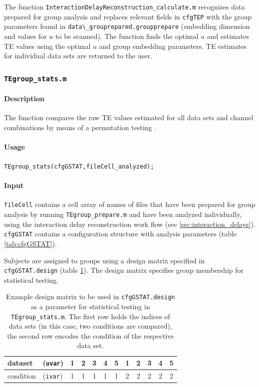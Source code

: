 \documentclass[a4paper,10pt]{article}
\begin{document}
The function \verb&InteractionDelayReconstruction_calculate.m& recognizes data prepared for group analysis and replaces relevant fields in \verb&cfgTEP& with the group parameters found in \verb&data\_grouprepared.groupprepare& (embedding dimension and values for $u$ to be scanned). The function finds the optimal $u$ and estimates TE values using the optimal $u$ and group embedding parameters. TE estimates for individual data sets are returned to the user. 

\subsubsection{\texttt{TEgroup\_stats.m}}

\paragraph*{Description} The function compares the raw TE values estimated for all data sets and channel combinations by means of a permutation testing \cite{maris2007,lindner2011}. 

\paragraph*{Usage} \verb&TEgroup_stats(cfgGSTAT,fileCell_analyzed);& 

\paragraph*{Input} \verb&fileCell& contains a cell array of names of files that have been prepared for group analysis by running \texttt{TEgroup\_prepare.m} and have been analyzed individually, using the interaction delay reconstruction work flow (see \ref{sec:interaction_delays}). \verb&cfgGSTAT& contains a configuration structure with analysis parameters (table \ref{tab:cfgGSTAT}).

Subjects are assigned to groups using a design matrix specified in \texttt{cfgGSTAT.design} (table \ref{tab:ex_designmatrix}). The design matrix specifies group membership for statistical testing.

\begin{table}[H]
\small \centering
\caption[Example design matrix]{Example design matrix to be used in \texttt{cfgGSTAT.design} as a parameter for statistical testing in \texttt{TEgroup\_stats.m}. The first row holds the indices of data sets (in this case, two conditions are compared), the second row encodes the condition of the respective data set.} 
\begin{tabular}{|ll|cccccccccc|}  \hline
 dataset   & (\verb+uvar+) & 1 & 2 & 3 & 4 & 5 & 1 & 2 & 3 & 4 & 5 \\ \hline
 condition & (\verb+ivar+) & 1 & 1 & 1 & 1 & 1 & 2 & 2 & 2 & 2 & 2 \\ \hline
\end{tabular}\label{tab:ex_designmatrix}
\end{table}
\end{document}
